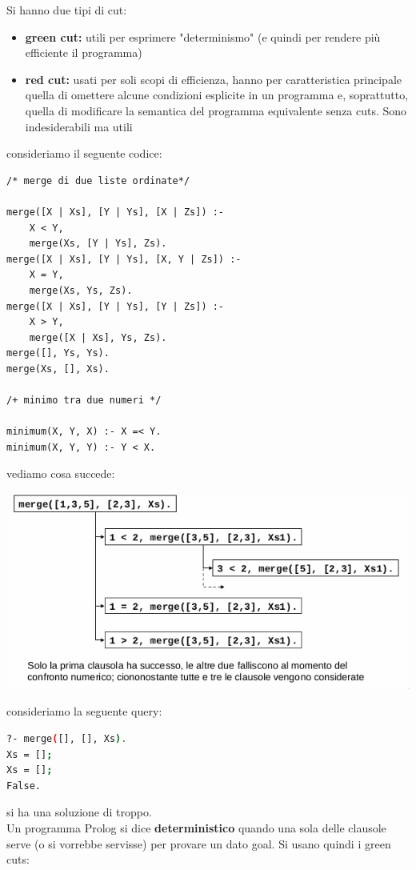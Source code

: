 \documentclass[a4paper,12pt, oneside]{book}
\begin{document}
Si hanno due tipi di cut:
\begin{itemize}
\item \textbf{green cut: } utili per esprimere "determinismo" (e quindi per rendere più efficiente il programma)
\item \textbf{red cut: } usati per soli scopi di efficienza, hanno per caratteristica principale quella di omettere alcune condizioni esplicite in un programma e, soprattutto, quella di modificare la semantica del programma equivalente senza cuts. Sono indesiderabili ma utili
\end{itemize}
consideriamo il seguente codice:
\begin{verbatim}
/* merge di due liste ordinate*/

merge([X | Xs], [Y | Ys], [X | Zs]) :-
	X < Y,
	merge(Xs, [Y | Ys], Zs).
merge([X | Xs], [Y | Ys], [X, Y | Zs]) :-
	X = Y,
	merge(Xs, Ys, Zs).
merge([X | Xs], [Y | Ys], [Y | Zs]) :-
	X > Y,
	merge([X | Xs], Ys, Zs).
merge([], Ys, Ys).
merge(Xs, [], Xs).

/+ minimo tra due numeri */

minimum(X, Y, X) :- X =< Y.
minimum(X, Y, Y) :- Y < X.
\end{verbatim}
vediamo cosa succede:
\begin{center}
\includegraphics[scale=0.8]{img/cut2.png}
\end{center}
consideriamo la seguente query:
\begin{shaded}
\begin{lstlisting}[language=bash]
?- merge([], [], Xs).
Xs = [];
Xs = [];
False.
\end{lstlisting}
\end{shaded}
si ha una soluzione di troppo.\\
Un programma Prolog si dice \textbf{deterministico} quando una sola delle clausole serve (o si vorrebbe servisse) per provare un dato goal. Si usano quindi i green cuts:
\end{document}
